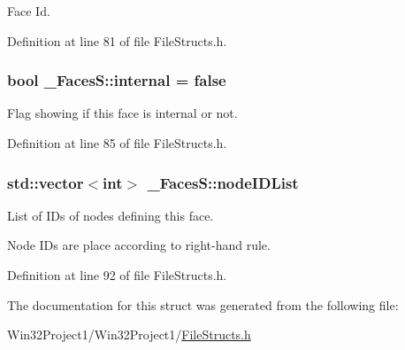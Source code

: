 Face Id. 



Definition at line 81 of file File\+Structs.\+h.

\subsubsection[{\texorpdfstring{internal}{internal}}]{\setlength{\rightskip}{0pt plus 5cm}bool \+\_\+\+Faces\+S\+::internal = false}\hypertarget{struct___faces_s_a5ce239e336aea528dad6008a6f2909f0}{}\label{struct___faces_s_a5ce239e336aea528dad6008a6f2909f0}


Flag showing if this face is internal or not. 



Definition at line 85 of file File\+Structs.\+h.

\subsubsection[{\texorpdfstring{node\+I\+D\+List}{nodeIDList}}]{\setlength{\rightskip}{0pt plus 5cm}std\+::vector$<$int$>$ \+\_\+\+Faces\+S\+::node\+I\+D\+List}\hypertarget{struct___faces_s_a1af35bd658b7be0f98e09deb5f8b3ead}{}\label{struct___faces_s_a1af35bd658b7be0f98e09deb5f8b3ead}


List of I\+Ds of nodes defining this face. 

Node I\+Ds are place according to right-\/hand rule. 

Definition at line 92 of file File\+Structs.\+h.



The documentation for this struct was generated from the following file\+:\begin{DoxyCompactItemize}
\item 
Win32\+Project1/\+Win32\+Project1/\hyperlink{_file_structs_8h}{File\+Structs.\+h}\end{DoxyCompactItemize}
